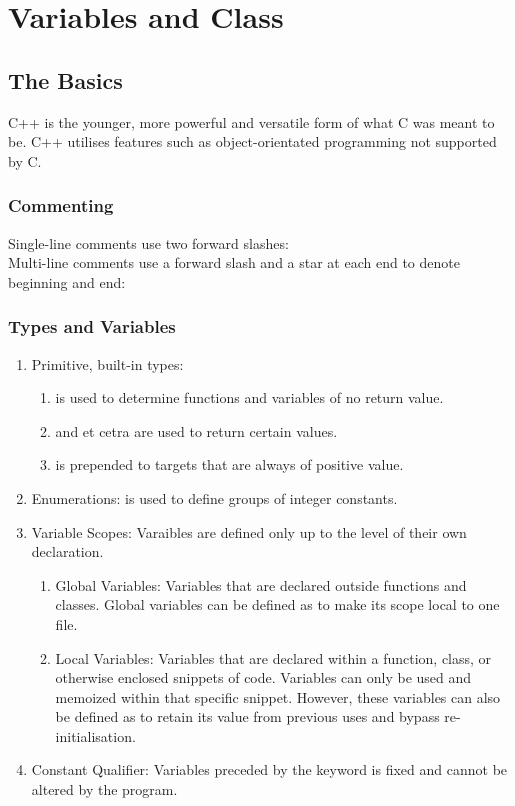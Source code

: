 \chapter{Variables and Class}

\section{The Basics}
C++ is the younger, more powerful and versatile form of what C was meant to be.
C++ utilises features such as object-orientated programming not supported by C.

\subsection{Commenting}
Single-line comments use two forward slashes: \\
Multi-line comments use a forward slash and a star at each end to denote
beginning and end: 

\subsection{Types and Variables}
\begin{enumerate}
\item Primitive, built-in types:
    \begin{enumerate}
    \item {} is used to determine functions and variables of no return
        value.
    \item {} and et cetra are used to return
        certain values.
    \item {} is prepended to targets that are always of positive
        value.
    \end{enumerate}
\item Enumerations:  is used to define groups of integer constants.
\item Variable Scopes: Varaibles are defined only up to the level of their own
    declaration.
    \begin{enumerate}
    \item Global Variables: Variables that are declared outside functions and
        classes. Global variables can be defined as  to make its
        scope local to one file.
    \item Local Variables: Variables that are declared within a function, class,
        or otherwise enclosed snippets of code. Variables can only be used and
        memoized within that specific snippet. However, these variables can also
        be defined as  to retain its value from previous uses and
        bypass re-initialisation.
    \end{enumerate}
\item Constant Qualifier: Variables preceded by the keyword  is fixed
    and cannot be altered by the program.
\end{enumerate}

